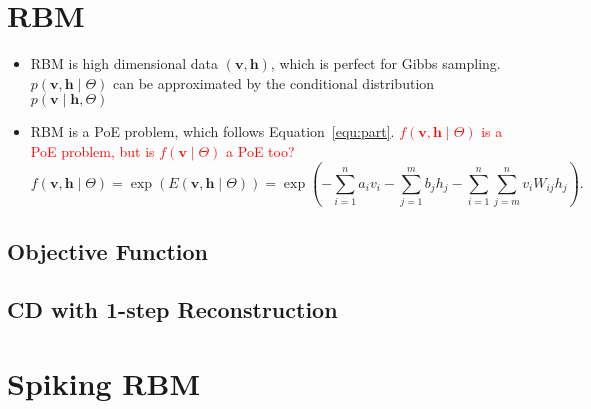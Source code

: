 \documentclass[11pt,twoside,a4paper]{article}
\begin{document}
\section{RBM\cite{zhang2013rbm}}
	\begin{itemize}
		\item RBM is high dimensional data $ (\mathbf{v}, \mathbf{h}) $, which is perfect for Gibbs sampling.
		$ p(\mathbf{v}, \mathbf{h} \mid \Theta) $ can be approximated by the conditional distribution $ p(\mathbf{v} \mid \mathbf{h}, \Theta) $
		\item RBM is a PoE problem, which follows Equation~\ref{equ:part}.
		\textcolor{red}{$ f(\mathbf{v}, \mathbf{h} \mid \Theta) $ is a PoE problem, but is $ f(\mathbf{v} \mid \Theta) $ a PoE too?}
		\begin{equation}
			f(\mathbf{v}, \mathbf{h} \mid \Theta) =\exp (E(\mathbf{v}, \mathbf{h} \mid \Theta)) = \exp (-\sum_{i=1}^n a_i v_i - \sum_{j=1}^m b_j h_j - \sum_{i=1}^n \sum_{j=m}^n v_i W_{ij} h_j).
		\end{equation}
	\end{itemize}
\subsection{Objective Function}
\subsection{CD with 1-step Reconstruction}
\section{Spiking RBM\cite{neftci2013event}}

 

\end{document}
